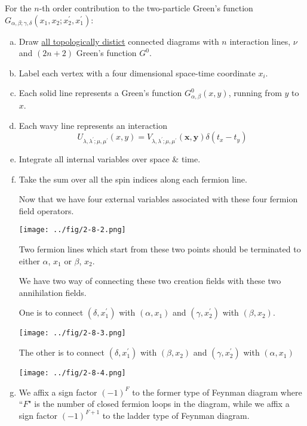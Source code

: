 For the $n$-th order contribution to the two-particle Green's function $G_{\alpha,\beta;\gamma,\delta}(x_1,x_2;x_2^{'},x_1^{'})$:
\begin{enumerate}[(a)]
\item Draw \underline{all topologically distict} connected diagrams with $n$ interaction lines, $\nu$ and $(2n+2)$ Green's function $G^0$.
\item Label each vertex with a four dimensional space-time coordinate $x_i$.
\item Each solid line represents a Green's function $G^0_{\alpha,\beta}(x,y)$, running from $y$ to $x$.
\item Each wavy line represents an interaction
\[U_{\lambda,\lambda^{'};\mu,\mu^{'}}(x,y) = V_{\lambda,\lambda^{'};\mu,\mu^{'}}(\mathbf{x},\mathbf{y}) \delta(t_x-t_y)\]
\item Integrate all internal variables over space \& time.
\item Take the sum over all the spin indices along each fermion line.

Now that we have four external variables associated with these four fermion field operators.

\begin{center} \label{Fig2.8.2}
\texttt{[image: ../fig/2-8-2.png]}
\end{center}

Two fermion lines which start from these two points should be terminated to either $\alpha$, $x_1$ or $\beta$, $x_2$.

We have two way of connecting these two creation fields with these two annihilation fields.

One is to connect $(\delta,x_1^{'})$ with $(\alpha,x_1)$ and $(\gamma,x_2^{'})$ with $(\beta,x_2)$.

\begin{center} \label{Fig2.8.3}
\texttt{[image: ../fig/2-8-3.png]}
\end{center}

The other is to connect $(\delta,x_1^{'})$ with $(\beta,x_2)$ and $(\gamma,x_2^{'})$ with $(\alpha,x_1)$

\begin{center} \label{Fig2.8.4}
\texttt{[image: ../fig/2-8-4.png]}
\end{center}

\item We affix a sign factor $(-1)^F$ to the former type of Feynman diagram where ``$F$" is the number of closed fermion loops in the diagram, while we affix a sign factor $(-1)^{F+1}$ to the ladder type of Feynman diagram.


\end{enumerate}
